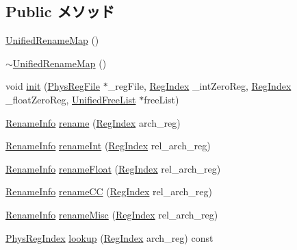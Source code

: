 \subsection*{Public メソッド}
\begin{DoxyCompactItemize}
\item 
\hyperlink{classUnifiedRenameMap_adb68a513c2ed7c97df59815528f619ba}{UnifiedRenameMap} ()
\item 
\hyperlink{classUnifiedRenameMap_a6ee32f6177b3a78b38df48300a3ea20e}{$\sim$UnifiedRenameMap} ()
\item 
void \hyperlink{classUnifiedRenameMap_a6e4d0eb7c0c24f15b95cbb4b0265f2bd}{init} (\hyperlink{classPhysRegFile}{PhysRegFile} $\ast$\_\-regFile, \hyperlink{classUnifiedRenameMap_a36d25e03e43fa3bb4c5482cbefe5e0fb}{RegIndex} \_\-intZeroReg, \hyperlink{classUnifiedRenameMap_a36d25e03e43fa3bb4c5482cbefe5e0fb}{RegIndex} \_\-floatZeroReg, \hyperlink{classUnifiedFreeList}{UnifiedFreeList} $\ast$freeList)
\item 
\hyperlink{classstd_1_1pair}{RenameInfo} \hyperlink{classUnifiedRenameMap_a7942f39856cc0a6ba2479855d2a7ab53}{rename} (\hyperlink{classUnifiedRenameMap_a36d25e03e43fa3bb4c5482cbefe5e0fb}{RegIndex} arch\_\-reg)
\item 
\hyperlink{classstd_1_1pair}{RenameInfo} \hyperlink{classUnifiedRenameMap_a73e9d8eeeeacc94d05a9cbd8524dc893}{renameInt} (\hyperlink{classUnifiedRenameMap_a36d25e03e43fa3bb4c5482cbefe5e0fb}{RegIndex} rel\_\-arch\_\-reg)
\item 
\hyperlink{classstd_1_1pair}{RenameInfo} \hyperlink{classUnifiedRenameMap_a64fe4a0e62e47d9087096b285d6b8d9f}{renameFloat} (\hyperlink{classUnifiedRenameMap_a36d25e03e43fa3bb4c5482cbefe5e0fb}{RegIndex} rel\_\-arch\_\-reg)
\item 
\hyperlink{classstd_1_1pair}{RenameInfo} \hyperlink{classUnifiedRenameMap_a1cebbe11de55db60d7ab86de7dbba6c7}{renameCC} (\hyperlink{classUnifiedRenameMap_a36d25e03e43fa3bb4c5482cbefe5e0fb}{RegIndex} rel\_\-arch\_\-reg)
\item 
\hyperlink{classstd_1_1pair}{RenameInfo} \hyperlink{classUnifiedRenameMap_a7d34d22eeeecf2193f17c5f6124db3e8}{renameMisc} (\hyperlink{classUnifiedRenameMap_a36d25e03e43fa3bb4c5482cbefe5e0fb}{RegIndex} rel\_\-arch\_\-reg)
\item 
\hyperlink{o3_2comm_8hh_a5ec29599c4bc29a3054c451674969e7b}{PhysRegIndex} \hyperlink{classUnifiedRenameMap_a149269d2ce2fbf7e13ec91a5647bf170}{lookup} (\hyperlink{classUnifiedRenameMap_a36d25e03e43fa3bb4c5482cbefe5e0fb}{RegIndex} arch\_\-reg) const 
\item 

\end{DoxyCompactItemize}
